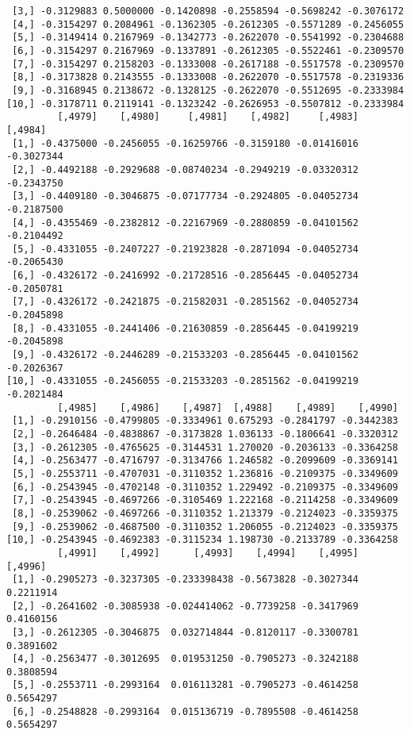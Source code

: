 \documentclass[
  letterpaper,
  DIV=11,
  numbers=noendperiod]{scrreprt}
\begin{document}
\begin{verbatim}
 [3,] -0.3129883 0.5000000 -0.1420898 -0.2558594 -0.5698242 -0.3076172
 [4,] -0.3154297 0.2084961 -0.1362305 -0.2612305 -0.5571289 -0.2456055
 [5,] -0.3149414 0.2167969 -0.1342773 -0.2622070 -0.5541992 -0.2304688
 [6,] -0.3154297 0.2167969 -0.1337891 -0.2612305 -0.5522461 -0.2309570
 [7,] -0.3154297 0.2158203 -0.1333008 -0.2617188 -0.5517578 -0.2309570
 [8,] -0.3173828 0.2143555 -0.1333008 -0.2622070 -0.5517578 -0.2319336
 [9,] -0.3168945 0.2138672 -0.1328125 -0.2622070 -0.5512695 -0.2333984
[10,] -0.3178711 0.2119141 -0.1323242 -0.2626953 -0.5507812 -0.2333984
         [,4979]    [,4980]     [,4981]    [,4982]     [,4983]    [,4984]
 [1,] -0.4375000 -0.2456055 -0.16259766 -0.3159180 -0.01416016 -0.3027344
 [2,] -0.4492188 -0.2929688 -0.08740234 -0.2949219 -0.03320312 -0.2343750
 [3,] -0.4409180 -0.3046875 -0.07177734 -0.2924805 -0.04052734 -0.2187500
 [4,] -0.4355469 -0.2382812 -0.22167969 -0.2880859 -0.04101562 -0.2104492
 [5,] -0.4331055 -0.2407227 -0.21923828 -0.2871094 -0.04052734 -0.2065430
 [6,] -0.4326172 -0.2416992 -0.21728516 -0.2856445 -0.04052734 -0.2050781
 [7,] -0.4326172 -0.2421875 -0.21582031 -0.2851562 -0.04052734 -0.2045898
 [8,] -0.4331055 -0.2441406 -0.21630859 -0.2856445 -0.04199219 -0.2045898
 [9,] -0.4326172 -0.2446289 -0.21533203 -0.2856445 -0.04101562 -0.2026367
[10,] -0.4331055 -0.2456055 -0.21533203 -0.2851562 -0.04199219 -0.2021484
         [,4985]    [,4986]    [,4987]  [,4988]    [,4989]    [,4990]
 [1,] -0.2910156 -0.4799805 -0.3334961 0.675293 -0.2841797 -0.3442383
 [2,] -0.2646484 -0.4838867 -0.3173828 1.036133 -0.1806641 -0.3320312
 [3,] -0.2612305 -0.4765625 -0.3144531 1.270020 -0.2036133 -0.3364258
 [4,] -0.2563477 -0.4716797 -0.3134766 1.246582 -0.2099609 -0.3369141
 [5,] -0.2553711 -0.4707031 -0.3110352 1.236816 -0.2109375 -0.3349609
 [6,] -0.2543945 -0.4702148 -0.3110352 1.229492 -0.2109375 -0.3349609
 [7,] -0.2543945 -0.4697266 -0.3105469 1.222168 -0.2114258 -0.3349609
 [8,] -0.2539062 -0.4697266 -0.3110352 1.213379 -0.2124023 -0.3359375
 [9,] -0.2539062 -0.4687500 -0.3110352 1.206055 -0.2124023 -0.3359375
[10,] -0.2543945 -0.4692383 -0.3115234 1.198730 -0.2133789 -0.3364258
         [,4991]    [,4992]      [,4993]    [,4994]    [,4995]   [,4996]
 [1,] -0.2905273 -0.3237305 -0.233398438 -0.5673828 -0.3027344 0.2211914
 [2,] -0.2641602 -0.3085938 -0.024414062 -0.7739258 -0.3417969 0.4160156
 [3,] -0.2612305 -0.3046875  0.032714844 -0.8120117 -0.3300781 0.3891602
 [4,] -0.2563477 -0.3012695  0.019531250 -0.7905273 -0.3242188 0.3808594
 [5,] -0.2553711 -0.2993164  0.016113281 -0.7905273 -0.4614258 0.5654297
 [6,] -0.2548828 -0.2993164  0.015136719 -0.7895508 -0.4614258 0.5654297

\end{verbatim}
\end{document}
